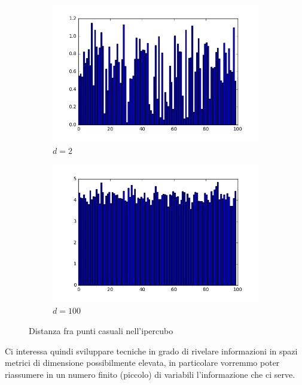 \begin{figure}[ht]
  \begin{center}
    \begin{subfigure}[b]{.4\textwidth}
      \includegraphics[width=\textwidth]{gfx/pltpoints2d.png}
      \caption{$d=2$}
    \end{subfigure}
    \begin{subfigure}[b]{.4\textwidth}
      \includegraphics[width=\textwidth]{gfx/pltpoints100d.png}
      \caption{$d=100$}
    \end{subfigure}
    \caption{Distanza fra punti casuali nell'ipercubo}  \label{fig:pointdistance}
  \end{center}
\end{figure}

Ci interessa quindi sviluppare tecniche in grado di rivelare informazioni in spazi metrici di dimensione possibilmente elevata, in particolare vorremmo poter riassumere in un numero finito (piccolo) di variabili l'informazione che ci serve.


